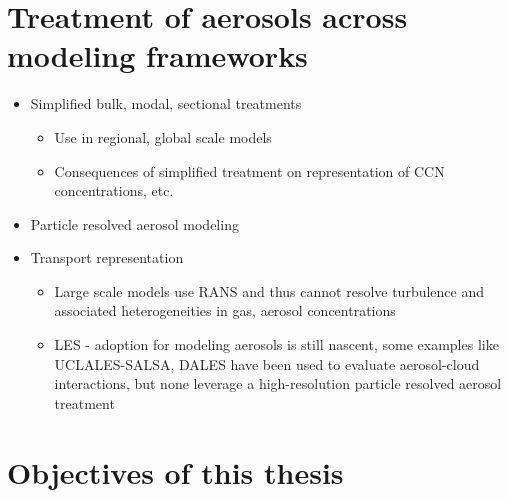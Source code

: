 \section{Treatment of aerosols across modeling frameworks}\label{aerosol_model_treatments} 

\begin{itemize}

\item Simplified bulk, modal, sectional treatments
\begin{itemize}
\item Use in regional, global scale models
\item Consequences of simplified treatment on representation of CCN concentrations, etc. 
\end{itemize}
\item Particle resolved aerosol modeling
\item Transport representation 
\begin{itemize}
\item Large scale models use RANS and thus cannot resolve turbulence and associated heterogeneities in gas, aerosol concentrations
\item LES - adoption for modeling aerosols is still nascent, some examples like UCLALES-SALSA, DALES have been used to evaluate aerosol-cloud interactions, but none leverage a high-resolution particle resolved aerosol treatment
\end{itemize}

\end{itemize}

\section{Objectives of this thesis}

